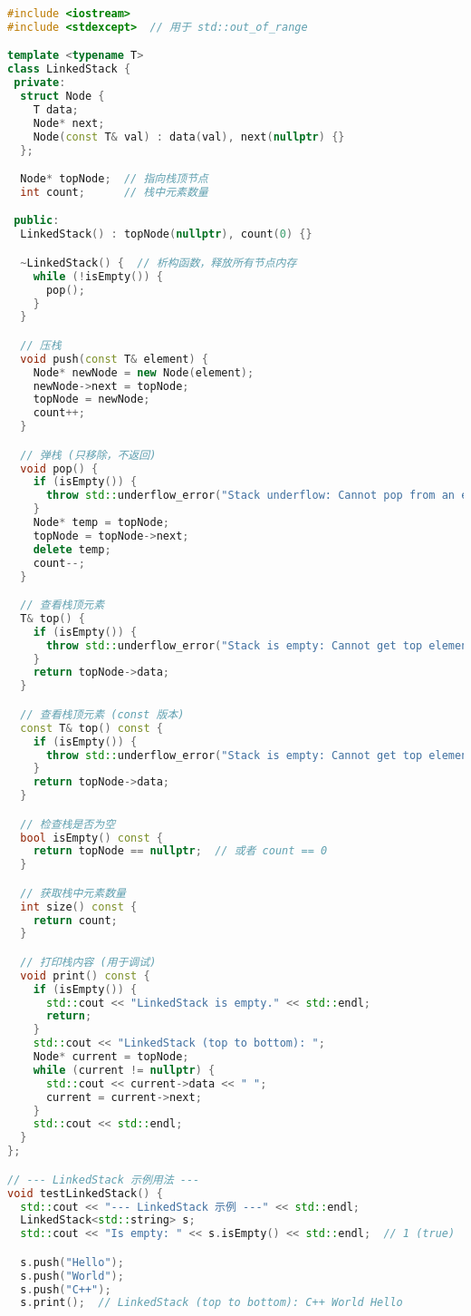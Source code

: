 \begin{lstlisting}[language=C++]
#include <iostream>
#include <stdexcept>  // 用于 std::out_of_range

template <typename T>
class LinkedStack {
 private:
  struct Node {
    T data;
    Node* next;
    Node(const T& val) : data(val), next(nullptr) {}
  };

  Node* topNode;  // 指向栈顶节点
  int count;      // 栈中元素数量

 public:
  LinkedStack() : topNode(nullptr), count(0) {}

  ~LinkedStack() {  // 析构函数，释放所有节点内存
    while (!isEmpty()) {
      pop();
    }
  }

  // 压栈
  void push(const T& element) {
    Node* newNode = new Node(element);
    newNode->next = topNode;
    topNode = newNode;
    count++;
  }

  // 弹栈 (只移除，不返回)
  void pop() {
    if (isEmpty()) {
      throw std::underflow_error("Stack underflow: Cannot pop from an empty stack.");
    }
    Node* temp = topNode;
    topNode = topNode->next;
    delete temp;
    count--;
  }

  // 查看栈顶元素
  T& top() {
    if (isEmpty()) {
      throw std::underflow_error("Stack is empty: Cannot get top element.");
    }
    return topNode->data;
  }

  // 查看栈顶元素 (const 版本)
  const T& top() const {
    if (isEmpty()) {
      throw std::underflow_error("Stack is empty: Cannot get top element.");
    }
    return topNode->data;
  }

  // 检查栈是否为空
  bool isEmpty() const {
    return topNode == nullptr;  // 或者 count == 0
  }

  // 获取栈中元素数量
  int size() const {
    return count;
  }

  // 打印栈内容 (用于调试)
  void print() const {
    if (isEmpty()) {
      std::cout << "LinkedStack is empty." << std::endl;
      return;
    }
    std::cout << "LinkedStack (top to bottom): ";
    Node* current = topNode;
    while (current != nullptr) {
      std::cout << current->data << " ";
      current = current->next;
    }
    std::cout << std::endl;
  }
};

// --- LinkedStack 示例用法 ---
void testLinkedStack() {
  std::cout << "--- LinkedStack 示例 ---" << std::endl;
  LinkedStack<std::string> s;
  std::cout << "Is empty: " << s.isEmpty() << std::endl;  // 1 (true)

  s.push("Hello");
  s.push("World");
  s.push("C++");
  s.print();  // LinkedStack (top to bottom): C++ World Hello


\end{lstlisting}
